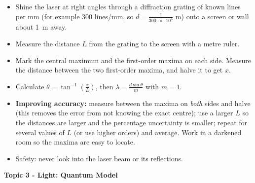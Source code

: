 \documentclass[12pt]{article}
\newcommand\anstopic[1]{\par\Needspace{8\baselineskip}\vspace{4mm}%
  \begin{center}{\headfont\bfseries\fontsize{14}{18}\selectfont #1\par}\end{center}\vspace{2pt}}
\begin{document}
\ansq
\begin{crit}
\end{crit}
\sample
\begin{itemize}
  \item Shine the laser at right angles through a diffraction grating of known lines per mm (for example
        300 lines/mm, so $d = \frac{1}{\num{300e3}}$ m) onto a screen or wall about \qty{1}{m} away.
  \item Measure the distance $L$ from the grating to the screen with a metre ruler.
  \item Mark the central maximum and the first-order maxima on each side. Measure the distance between
        the two first-order maxima, and halve it to get $x$.
  \item Calculate $\theta = \tan^{-1}\!\left(\frac{x}{L}\right)$, then $\lambda = \frac{d\sin\theta}{m}$ with
        $m = 1$.
  \item \textbf{Improving accuracy:} measure between the maxima on \emph{both} sides and halve (this
        removes the error from not knowing the exact centre); use a larger $L$ so the distances are larger
        and the percentage uncertainty is smaller; repeat for several values of $L$ (or use higher orders)
        and average. Work in a darkened room so the maxima are easy to locate.
  \item Safety: never look into the laser beam or its reflections.
\end{itemize}

\anstopic{Topic 3 - Light: Quantum Model}
\end{document}
